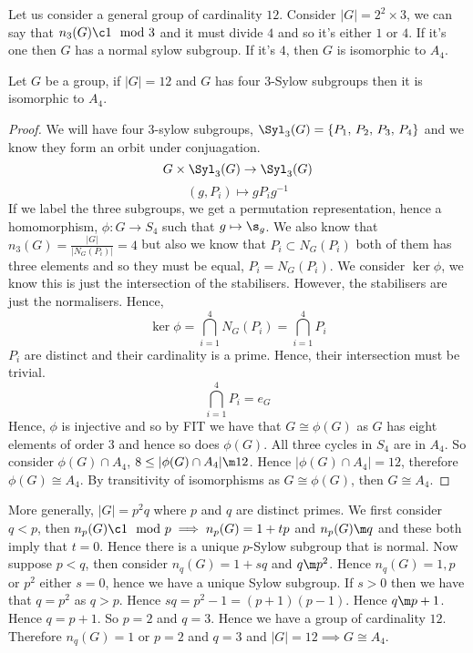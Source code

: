 \noindent
Let us consider a general group of cardinality $12$. Consider $|G| = 2^2 \times 3$, we can say that $n_3(G) \c 1 \mod 3$ and it must divide $4$ and so it's either $1$ or $4$. If it's one then $G$ has a normal sylow subgroup. If it's $4$, then $G$ is isomorphic to $A_4$.
\begin{claim}
  Let $G$ be a group, if $|G|= 12$ and $G$ has four $3$-Sylow subgroups then it is isomorphic to $A_4$.
\end{claim}
\begin{proof}
  We will have four $3$-sylow subgroups, $\Syl_3(G) = \{P_1,\,P_2,\,P_3,\,P_4\}$ and we know they form an orbit under conjuagation.
  $$ G\times \Syl_3(G) \to \Syl_3(G)$$
  $$ (g, P_i) \mapsto gP_ig^{-1} $$
  If we label the three subgroups, we get a permutation representation, hence a homomorphism, $\phi : G \to S_4$ such that $g \mapsto \s_g$. We also know that $n_3(G) = \frac{|G|}{|N_G(P_i)|} = 4$ but also we know that $P_i \subset N_G(P_i)$ both of them has three elements and so they must be equal, $P_i = N_G(P_i)$. We consider $\ker\phi$, we know this is just the intersection of the stabilisers. However, the stabilisers are just the normalisers. Hence,
  $$ \ker \phi = \bigcap_{i=1}^4 N_G(P_i) = \bigcap_{i=1}^4 P_i $$
  $P_i$ are distinct and their cardinality is a prime. Hence, their intersection must be trivial.
  $$ \bigcap_{i=1}^4 P_i = e_G $$
  Hence, $\phi$ is injective and so by FIT we have that $G \cong \phi(G)$ as $G$ has eight elements of order $3$ and hence so does $\phi(G)$. All three cycles in $S_4$ are in $A_4$. So consider $\phi(G) \cap A_4$, $8 \le |\phi(G) \cap A_4| \m 12$. Hence $|\phi(G) \cap A_4| = 12$, therefore $\phi(G) \cong A_4$. By transitivity of isomorphisms as $G \cong \phi(G)$, then $G \cong A_4$.
\end{proof}

More generally, $|G| = p^2 q$ where $p$ and $q$ are distinct primes. We first consider $q < p$, then $n_p(G) \c 1 \mod p \implies n_p(G) = 1 + tp$ and $n_p(G) \m q$ and these both imply that $t = 0$. Hence there is a unique $p$-Sylow subgroup that is normal. Now suppose $p < q$, then consider $n_q(G) = 1 + sq$ and $q \m p^2$. Hence $n_q(G) = 1, p$ or $p^2$ either $s = 0$, hence we have a unique Sylow subgroup. If $s > 0$ then we have that $q = p^2$ as $q > p$. Hence $sq = p^2 - 1 = (p+1)(p-1)$. Hence $q \m p + 1$. Hence $q = p + 1$. So $p =2$ and $q = 3$. Hence we have a group of cardinality $12$. Therefore $n_q(G) = 1$ or $p = 2$ and $q = 3$ and $|G| = 12 \implies G \cong A_4$.
